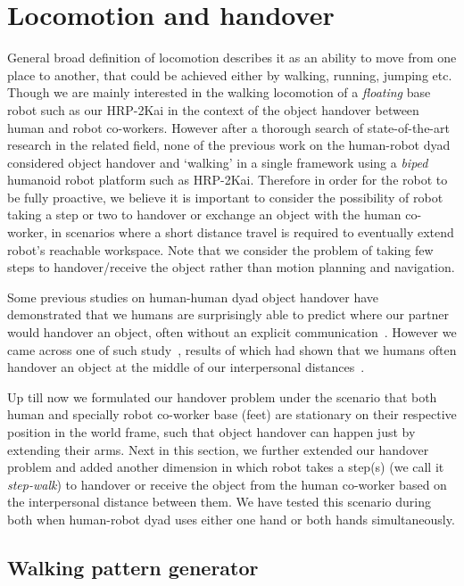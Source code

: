 \clearpage

\section{Locomotion and handover}

General broad definition of locomotion describes it as an ability to move from one place to another, that could be achieved either by walking, running, jumping etc. Though we are mainly interested in the walking locomotion of a \textit{floating} base robot such as our HRP-2Kai in the context of the object handover between human and robot co-workers. However after a thorough search of state-of-the-art research in the related field, none of the previous work on the human-robot dyad considered object handover and `walking' in a single framework using a \textit{biped} humanoid robot platform such as HRP-2Kai. Therefore in order for the robot to be fully proactive, we believe it is important to consider the possibility of robot taking a step or two to handover or exchange an object with the human co-worker, in scenarios where a short distance travel is required to eventually extend robot's reachable workspace. Note that we consider the problem of taking few steps to handover/receive the object rather than motion planning and navigation.

Some previous studies on human-human dyad object handover have demonstrated that we humans are surprisingly able to predict where our partner would handover an object, often without an explicit communication~\cite{kato2018humans, kato2019handovers}. However we came across one of such study~\cite{hansen2017human}, results of which had shown that we humans often handover an object at the middle of our interpersonal distances~\cite{hall1966proxemic, strabala2013toward}.

Up till now we formulated our handover problem under the scenario that both human and specially robot co-worker base (feet) are stationary on their respective position in the world frame, such that object handover can happen just by extending their arms. Next in this section, we further extended our handover problem and added another dimension in which robot takes a step(s) (we call it \textit{step-walk}) to handover or receive the object from the human co-worker based on the interpersonal distance between them. We have tested this scenario during both when human-robot dyad uses either one hand or both hands simultaneously.


\subsection{Walking pattern generator}

